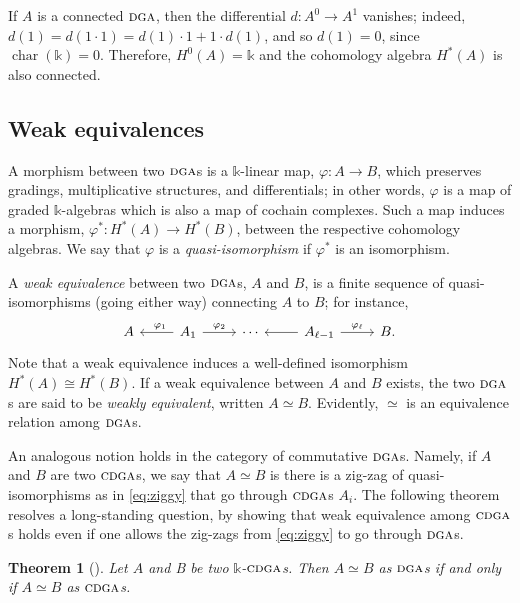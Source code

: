 \documentclass{article}
\numberwithin{equation}{section}
\newtheorem{theorem}{Theorem}[section]
\theoremstyle{definition}
\renewcommand{\k}{\mathbb{k}}
\newcommand{\dga}{\ensuremath{\textsc{dga}}}
\newcommand{\cdga}{\ensuremath{\textsc{cdga}}}
\DeclareMathOperator{\ch}{char}
\begin{document}
 If $A$ is a connected 
$\dga$, then the differential $d\colon A^0\to A^1$ vanishes; indeed,  
$d(1)=d(1\cdot1)=d(1)\cdot 1+1\cdot d(1)$, and so $d(1)=0$, 
since $\ch(\k)=0$.  Therefore, $H^0(A)=\k$ and the cohomology 
algebra $H^*(A)$ is also connected.  

\subsection{Weak equivalences}
\label{subsec:qiso}
A morphism between two $\dga$s is a $\k$-linear map, $\varphi\colon A\to  B$, 
which preserves gradings, multiplicative structures, and differentials; in other words,  
$\varphi$ is a map of graded $\k$-algebras which is also a map of cochain 
complexes. Such a map induces a morphism, $\varphi^*\colon H^{*} (A)\to H^{*} (B)$, 
between the respective cohomology algebras.  We say that $\varphi$ is a 
{\em quasi-isomor\-phism}\/ if $\varphi^*$ is an isomorphism. 

A {\em weak equivalence}\/ between two $\dga$s, $A$ and $B$, is a finite 
sequence of quasi-isomor\-phisms (going either way) connecting $A$ to $B$; 
for instance, 
\begin{equation}
\label{eq:ziggy}
\begin{tikzcd}
A  & A_1 \ar[l, pos=0.4, "\varphi_1"'] \ar[r, "\varphi_2"] & \cdots 
& A_{\ell-1}   \ar[l] \ar[r, "\varphi_{\ell}"] & B .
\end{tikzcd}
\end{equation}
Note that a weak equivalence induces a well-defined isomorphism 
$H^*(A)\cong H^*(B)$. If a  weak equivalence between $A$ and $B$ 
exists, the two $\dga$s are said to be {\em weakly equivalent}, 
written $A\simeq B$. Evidently, $\simeq$ is an equivalence 
relation among $\dga$s. 

An analogous notion holds in the category of commutative $\dga$s.  
Namely, if $A$ and $B$ are two $\cdga$s, we say that $A\simeq B$ 
is there is a zig-zag of quasi-isomorphisms as in \eqref{eq:ziggy} 
that go through $\cdga$s $A_i$.
The following theorem resolves a long-standing question, 
by showing that weak equivalence among $\cdga$s holds even if one 
allows the zig-zags from \eqref{eq:ziggy} to go through $\dga$s. 

\begin{theorem}[\cite{CPRW}]
\label{thm:cprw}
Let $A$ and B be two $\k$-$\cdga$s. Then 
$A \simeq B$ as $\dga$s if and only if $A \simeq B$ as $\cdga$s.
\end{theorem}
\end{document}
